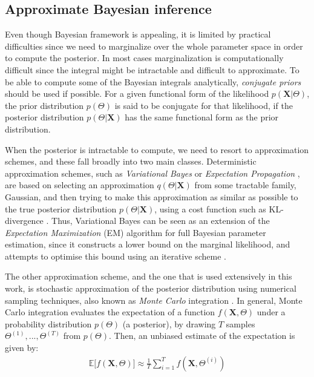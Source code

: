 \subsection{Approximate Bayesian inference} \label{approx-bayes-infer-subsect}
Even though Bayesian framework is appealing, it is limited by practical difficulties since we need to marginalize over the whole parameter space in order to compute the posterior. In most cases marginalization is computationally difficult since the integral might be intractable and difficult to approximate. To be able to compute some of the Bayesian integrals analytically, \emph{conjugate priors} should be used if possible. For a given functional form of the likelihood $p(\mathbf{X}|\Theta)$, the prior distribution $p(\Theta)$ is said to be conjugate for that likelihood, if the posterior distribution $p(\Theta|\mathbf{X})$ has the same functional form as the prior distribution.

When the posterior is intractable to compute, we need to resort to approximation schemes, and these fall broadly into two main classes. Deterministic approximation schemes, such as \emph{Variational Bayes} \citep{Beal2003} or \emph{Expectation Propagation} \citep{Minka1999}, are based on selecting an approximation $q(\Theta|\mathbf{X})$ from some tractable family, \eg Gaussian, and then trying to make this approximation as similar as possible to the true posterior distribution $p(\Theta|\mathbf{X})$, using a cost function such as KL-divergence \cite[Ch. 21]{Murphy2012}. Thus, Variational Bayes can be seen as an extension of the \emph{Expectation Maximization} (EM) algorithm for full Bayesian parameter estimation, since it constructs a lower bound on the marginal likelihood, and attempts to optimise this bound using an iterative scheme \citep{Beal2003}.

The other approximation scheme, and the one that is used extensively in this work, is stochastic approximation of the posterior distribution using numerical sampling techniques, also known as \emph{Monte Carlo} integration \citep{Robert1999, Liu2001}. In general, Monte Carlo integration evaluates the expectation of a function $f(\mathbf{X},\Theta)$ under a probability distribution $p(\Theta)$ (\eg a posterior), by drawing $T$ samples $\Theta^{(1)},...,\Theta^{(T)}$ from $p(\Theta)$. Then, an unbiased estimate of the expectation is given by:
\begin{equation} \label{mc-f-bayes}
  \begin{aligned}
	\mathbb{E}\big[ f(\mathbf{X}, \Theta)\big] \approx \frac{1}{T} \sum\limits_{i=1}^{T} f(\mathbf{X}, \Theta^{(i)})
  \end{aligned}
\end{equation}

